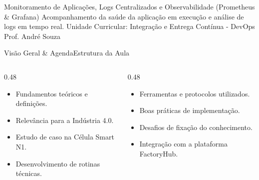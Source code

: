 
\senaicover
  {Monitoramento de Aplicações, Logs Centralizados e Observabilidade (Prometheus & Grafana)}
  {Acompanhamento da saúde da aplicação em execução e análise de logs em tempo real.}
  {Unidade Curricular: Integração e Entrega Contínua - DevOps}
  {Prof. André Souza}

\begin{senaiframe}{Visão Geral \& Agenda}{Estrutura da Aula}
  \begin{columns}[t]
    \begin{column}{0.48\textwidth}
      \begin{tcolorbox}[senaibluecard, title={1. Conceitos Chave}]
        \begin{itemize}
          \item Fundamentos teóricos e definições.
          \item Relevância para a Indústria 4.0.
        \end{itemize}
      \end{tcolorbox}
      \vspace{4pt}
      \begin{tcolorbox}[senaiambercard, title={3. Aplicação Prática}]
        \begin{itemize}
          \item Estudo de caso na Célula Smart N1.
          \item Desenvolvimento de rotinas técnicas.
        \end{itemize}
      \end{tcolorbox}
    \end{column}
    \begin{column}{0.48\textwidth}
      \begin{tcolorbox}[senairedcard, title={2. Detalhamento Técnico}]
        \begin{itemize}
          \item Ferramentas e protocolos utilizados.
          \item Boas práticas de implementação.
        \end{itemize}
      \end{tcolorbox}
      \vspace{4pt}
      \begin{tcolorbox}[senaigreencard, title={4. Exercícios \& Avaliação}]
        \begin{itemize}
          \item Desafios de fixação do conhecimento.
          \item Integração com a plataforma FactoryHub.
        \end{itemize}
      \end{tcolorbox}
    \end{column}
  \end{columns}
\end{senaiframe}

